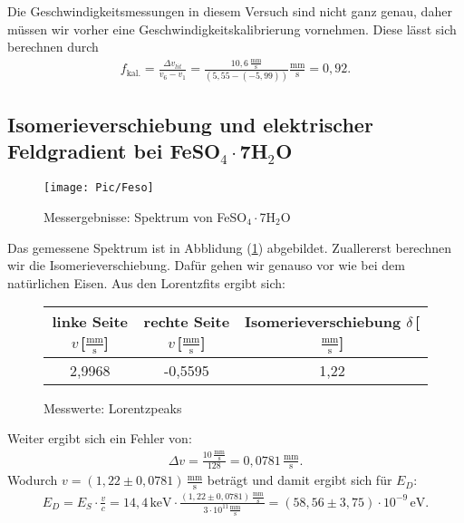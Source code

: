 \documentclass[10pt,twoside]{article}
\renewcommand{\1}{^{-1}}
\renewcommand{\2}{^{-2}}
\newcommand{\3}{^{-3}}
\newcommand{\4}{^{-4}}
\newcommand{\5}{^{-5}}
\newcommand{\6}{^{-6}}
\newcommand{\7}{^{-7}}
\newcommand{\8}{^{-8}}
\newcommand{\9}{^{-9}}
\begin{document}
Die Geschwindigkeitsmessungen in diesem Versuch sind nicht ganz genau, daher müssen wir vorher eine Geschwindigkeitskalibrierung vornehmen. Diese lässt sich berechnen durch
\begin{align*}
f_{\text{kal.}} =\frac{\Delta v_{lit}}{v_6-v_1}=\frac{10,6\,\frac{\text{mm}}{\text{s}}}{(5,55-(-5,99))}\frac{\text{mm}}{\text{s}} = 0,92.
\end{align*}


\subsection{Isomerieverschiebung und elektrischer Feldgradient bei FeSO$_4\cdot$7H$_2$O}

\begin{figure}[H]
\centering
\texttt{[image: Pic/Feso]}
\caption{Messergebnisse: Spektrum von FeSO$_4\cdot$7H$_2$O}
\label{Feso}
\end{figure}

Das gemessene Spektrum ist in Abblidung (\ref{Feso}) abgebildet. Zuallererst berechnen wir die Isomerieverschiebung. Dafür gehen wir genauso vor wie bei dem natürlichen Eisen. Aus den Lorentzfits ergibt sich:
\begin{figure}[H]
\centering
\begin{tabular}{c|c||c}
\hline 
\rule[-1ex]{0pt}{2.5ex} linke Seite $v$\,[$\frac{\text{mm}}{\text{s}}$] & rechte Seite $v$\,[$\frac{\text{mm}}{\text{s}}$] & Isomerieverschiebung $\delta$\,[$\frac{\text{mm}}{\text{s}}$]  \\ 
\hline 
\rule[-1ex]{0pt}{2.5ex} 2,9968 & -0,5595 & 1,22 \\ 
\hline 
\end{tabular} 
\caption{Messwerte: Lorentzpeaks}
\end{figure}
Weiter ergibt sich ein Fehler von:
\begin{align*}
\Delta v = \frac{10\,\frac{\text{mm}}{\text{s}}}{128} = 0,0781\,\frac{\text{mm}}{\text{s}}.
\end{align*}
Wodurch $v=(1,22\pm 0,0781)\,\frac{\text{mm}}{\text{s}}$
beträgt und damit ergibt sich für ${E}_{{D}}$:
\begin{align*}
{E}_{{D}} = E_S\cdot\frac{v}{c} = 14,4\,\text{keV}\cdot\frac{(1,22\pm0,0781)\,\frac{\text{mm}}{\text{s}}}{3\cdot 10^{11} \frac{\text{mm}}{\text{s}} } = (58,56\pm 3,75)\cdot 10^{-9}\,\text{eV}.
\end{align*} 
\end{document}
